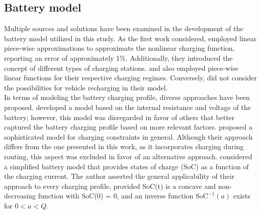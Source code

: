 \subsection*{Battery model}
Multiple sources and solutions have been examined in the development of the battery model utilized in this study. As the first work considered,  employed linear piece-wise approximations to approximate the nonlinear charging function, reporting an error of approximately 1\%. Additionally, they introduced the concept of different types of charging stations.  and  also employed piece-wise linear functions for their respective charging regimes. Conversely,  did not consider the possibilities for vehicle recharging in their model.\\
In terms of modeling the battery charging profile, diverse approaches have been proposed.  developed a model based on the internal resistance and voltage of the battery; however, this model was disregarded in favor of others that better captured the battery charging profile based on more relevant factors.  proposed a sophisticated model for charging constraints in general. Although their approach differs from the one presented in this work, as it incorporates charging during routing, this aspect was excluded in favor of an alternative approach.  considered a simplified battery model that provides states of charge (SoC) as a function of the charging current. The author asserted the general applicability of their approach to every charging profile, provided SoC(t) is a concave and non-decreasing function with SoC(0) = 0, and an inverse function $\text{SoC}^{-1}(a)$ exists for $0 < a < Q$.\\

